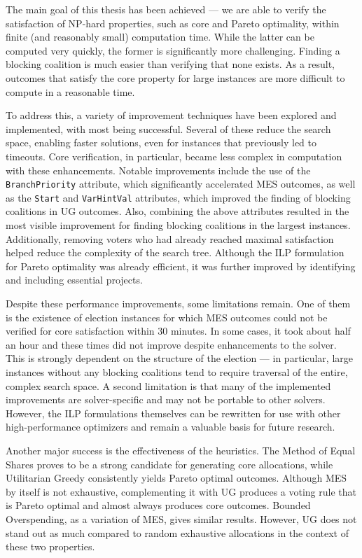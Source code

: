 \documentclass[magisterska,en]{pracamgr}
\begin{document}
The main goal of this thesis has been achieved --- we are able to verify the satisfaction of NP-hard properties, such as core and Pareto optimality, within finite (and reasonably small) computation time. While the latter can be computed very quickly, the former is significantly more challenging. Finding a blocking coalition is much easier than verifying that none exists. As a result, outcomes that satisfy the core property for large instances are more difficult to compute in a reasonable time.

To address this, a variety of improvement techniques have been explored and implemented, with most being successful. Several of these reduce the search space, enabling faster solutions, even for instances that previously led to timeouts. Core verification, in particular, became less complex in computation with these enhancements. Notable improvements include the use of the \texttt{BranchPriority} attribute, which significantly accelerated MES outcomes, as well as the \texttt{Start} and \texttt{VarHintVal} attributes, which improved the finding of blocking coalitions in UG outcomes. Also, combining the above attributes resulted in the most visible improvement for finding blocking coalitions in the largest instances. Additionally, removing voters who had already reached maximal satisfaction helped reduce the complexity of the search tree. Although the ILP formulation for Pareto optimality was already efficient, it was further improved by identifying and including essential projects.

Despite these performance improvements, some limitations remain. One of them is the existence of election instances for which MES outcomes could not be verified for core satisfaction within 30 minutes. In some cases, it took about half an hour and these times did not improve despite enhancements to the solver. This is strongly dependent on the structure of the election --- in particular, large instances without any blocking coalitions tend to require traversal of the entire, complex search space. A second limitation is that many of the implemented improvements are solver-specific and may not be portable to other solvers. However, the ILP formulations themselves can be rewritten for use with other high-performance optimizers and remain a valuable basis for future research.

Another major success is the effectiveness of the heuristics. The Method of Equal Shares proves to be a strong candidate for generating core allocations, while Utilitarian Greedy consistently yields Pareto optimal outcomes. Although MES by itself is not exhaustive, complementing it with UG produces a voting rule that is Pareto optimal and almost always produces core outcomes. Bounded Overspending, as a variation of MES, gives similar results. However, UG does not stand out as much compared to random exhaustive allocations in the context of these two properties.
\end{document}
